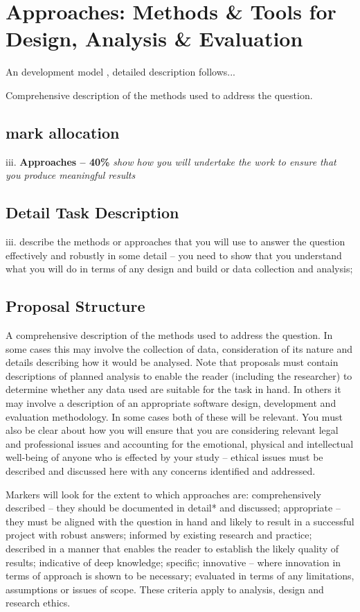 \section{Approaches: Methods \& Tools for Design, Analysis \& Evaluation}

An development model \parencite{Dawson:2009:PCI:1611433}, detailed description follows...

Comprehensive description of the methods used to address the question.

\subsection{mark allocation}

iii. \textbf{Approaches -- 40\%}
\textit{show how you will undertake the work to ensure that you produce meaningful results}


\subsection{Detail Task Description} 
iii. describe the methods or approaches that you will use to answer the question effectively and robustly in some detail -- you need to show that you understand what you will do in terms of any design and build or data collection and analysis;

\subsection{Proposal Structure}

A comprehensive description of the methods used to address the question. In some cases this may involve the collection of data, consideration of its nature and details describing how it would be analysed. Note that proposals must contain descriptions of planned analysis to enable the reader (including the researcher) to determine whether any data used are suitable for the task in hand. In others it may involve a description of an appropriate software design, development and evaluation methodology. In some cases both of these will be relevant. You must also be clear about how you will ensure that you are considering relevant legal and professional issues and accounting for the emotional, physical and intellectual well-being of anyone who is effected by your study -- ethical issues must be described and discussed here with any concerns identified and addressed.

Markers will look for the extent to which approaches are: comprehensively described -- they should be documented in detail* and discussed; appropriate -- they must be aligned with the question in hand and likely to result in a successful project with robust answers; informed by existing research and practice; described in a manner that enables the reader to establish the likely quality of results; indicative of deep knowledge; specific; innovative -- where innovation in terms of approach is shown to be necessary; evaluated in terms of any limitations, assumptions or issues of scope. These criteria apply to analysis, design and research ethics.

